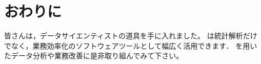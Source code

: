 \documentclass[../main]{subfiles}
\begin{document}
\section{おわりに}
皆さんは，データサイエンティストの道具を手に入れました。
\R は統計解析だけでなく，業務効率化のソフトウェアツールとして幅広く活用できます．
\R を用いたデータ分析や業務改善に是非取り組んでみて下さい。
\end{document}
